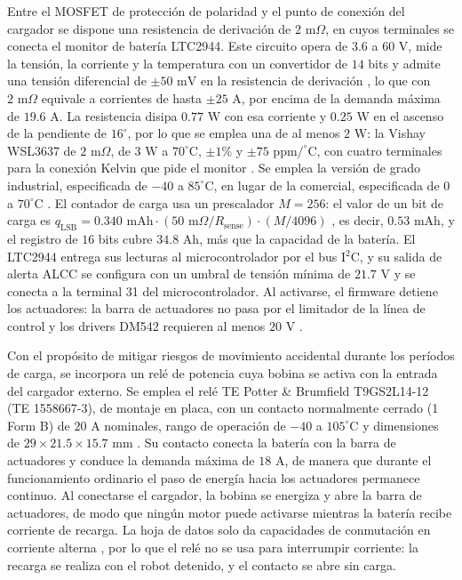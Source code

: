 \documentclass[../../General.tex]{subfiles}
\begin{document}
Entre el MOSFET de protección de polaridad y el punto de conexión del cargador se dispone una resistencia de derivación de $2\text{ m}\Omega$, en cuyos terminales se conecta el monitor de batería LTC2944. Este circuito opera de $3.6$ a $60\text{ V}$, mide la tensión, la corriente y la temperatura con un convertidor de $14$ bits y admite una tensión diferencial de $\pm 50\text{ mV}$ en la resistencia de derivación \citep{adi_ltc2944}, lo que con $2\text{ m}\Omega$ equivale a corrientes de hasta $\pm 25\text{ A}$, por encima de la demanda máxima de $19.6\text{ A}$. La resistencia disipa $0.77\text{ W}$ con esa corriente y $0.25\text{ W}$ en el ascenso de la pendiente de $16^\circ$, por lo que se emplea una de al menos $2\text{ W}$: la Vishay WSL3637 de $2\text{ m}\Omega$, de $3\text{ W}$ a $70^\circ\text{C}$, $\pm 1\%$ y $\pm 75\text{ ppm/}^\circ\text{C}$, con cuatro terminales para la conexión Kelvin \citep{vishay_wsl3637} que pide el monitor \citep{adi_ltc2944}. Se emplea la versión de grado industrial, especificada de $-40$ a $85^\circ\text{C}$, en lugar de la comercial, especificada de $0$ a $70^\circ\text{C}$ \citep{adi_ltc2944}. El contador de carga usa un prescalador $M = 256$: el valor de un bit de carga es $q_{\text{LSB}} = 0.340\text{ mAh} \cdot (50\text{ m}\Omega / R_{\text{sense}}) \cdot (M/4096)$ \citep{adi_ltc2944}, es decir, $0.53\text{ mAh}$, y el registro de $16$ bits cubre $34.8\text{ Ah}$, más que la capacidad de la batería. El LTC2944 entrega sus lecturas al microcontrolador por el bus I$^2$C, y su salida de alerta ALCC se configura con un umbral de tensión mínima de $21.7\text{ V}$ y se conecta a la terminal 31 del microcontrolador. Al activarse, el firmware detiene los actuadores: la barra de actuadores no pasa por el limitador de la línea de control y los drivers DM542 requieren al menos $20\text{ V}$ \citep{leadshine_dm542}.

Con el propósito de mitigar riesgos de movimiento accidental durante los períodos de carga, se incorpora un relé de potencia cuya bobina se activa con la entrada del cargador externo. Se emplea el relé TE Potter \& Brumfield T9GS2L14-12 (TE 1558667-3), de montaje en placa, con un contacto normalmente cerrado (1 Form B) de $20\text{ A}$ nominales, rango de operación de $-40$ a $105^\circ\text{C}$ y dimensiones de $29 \times 21.5 \times 15.7\text{ mm}$ \citep{te_t9gs2l14,te_t9g}. Su contacto conecta la batería con la barra de actuadores y conduce la demanda máxima de $18\text{ A}$, de manera que durante el funcionamiento ordinario el paso de energía hacia los actuadores permanece continuo. Al conectarse el cargador, la bobina se energiza y abre la barra de actuadores, de modo que ningún motor puede activarse mientras la batería recibe corriente de recarga. La hoja de datos solo da capacidades de conmutación en corriente alterna \citep{te_t9g}, por lo que el relé no se usa para interrumpir corriente: la recarga se realiza con el robot detenido, y el contacto se abre sin carga.
\end{document}
